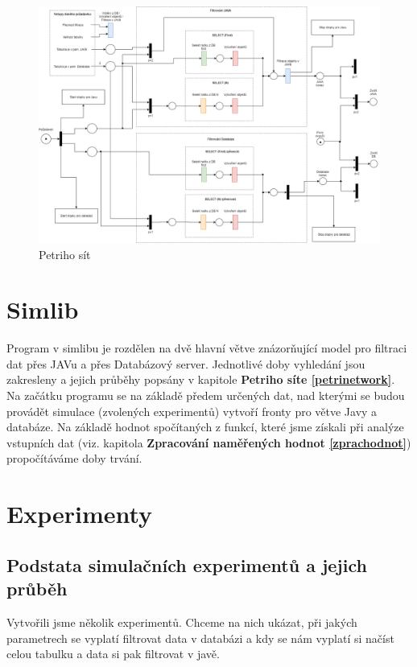 \documentclass[a4paper, 11pt]{article}
\begin{document}
\newpage
\begin{figure}[H]
\centering
\includegraphics[width=220mm,  angle =90]{images/IMS-projekt.png}
\caption{Petriho sít}
\label{sec:obr7}
\end{figure}
\newpage

\section{Simlib} \label{sec:simlib}
Program v simlibu\cite{simlib_web, simlib_zdroj} je rozdělen na dvě hlavní větve znázorňující model pro filtraci dat přes JAVu a přes Databázový server. Jednotlivé doby vyhledání jsou zakresleny a jejich průběhy popsány v kapitole \textbf{Petriho síte \ref{petrinetwork}}. Na začátku programu se na základě předem určených dat, nad kterými se budou provádět simulace (zvolených experimentů) vytvoří fronty pro větve Javy a databáze. Na základě hodnot spočítaných z funkcí, které jsme získali při analýze vstupních dat (viz. kapitola \textbf{Zpracování naměřených hodnot \ref{zprachodnot}}) propočítáváme doby trvání.

\section{Experimenty} \label{sec:experimenty}
\subsection{Podstata simulačních experimentů a jejich průběh}
Vytvořili jsme několik experimentů. Chceme na nich ukázat, při jakých parametrech se vyplatí filtrovat data v databázi a kdy se nám vyplatí si načíst celou tabulku a data si pak filtrovat v javě.
\end{document}
